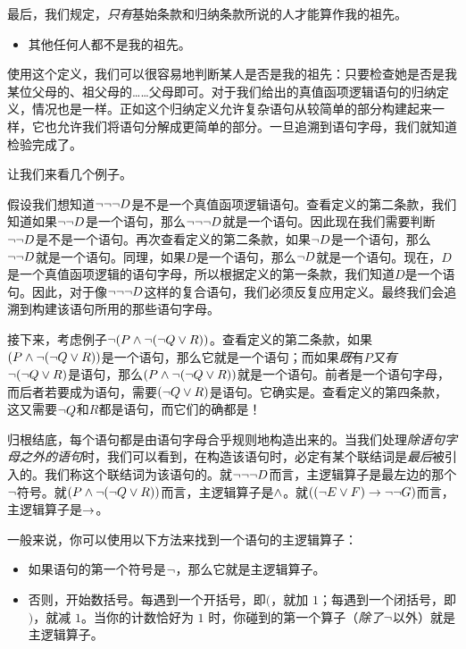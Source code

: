 最后，我们规定，\emph{只有}基始条款和归纳条款所说的人才能算作我的祖先。


\begin{itemize}
		\item 其他任何人都不是我的祖先。
	\end{itemize}


使用这个定义，我们可以很容易地判断某人是否是我的祖先：只要检查她是否是我某位父母的、祖父母的……父母即可。对于我们给出的真值函项逻辑语句的归纳定义，情况也是一样。正如这个归纳定义允许复杂语句从较简单的部分构建起来一样，它也允许我们将语句分解成更简单的部分。一旦追溯到语句字母，我们就知道检验完成了。

让我们来看几个例子。

假设我们想知道$\neg \neg \neg D$是不是一个真值函项逻辑语句。查看定义的第二条款，我们知道如果$\neg \neg D$是一个语句，那么$\neg \neg \neg D$就是一个语句。因此现在我们需要判断$\neg \neg D$是不是一个语句。再次查看定义的第二条款，如果$\neg D$是一个语句，那么$\neg \neg D$就是一个语句。同理，如果$D$是一个语句，那么$\neg D$就是一个语句。现在，$D$是一个真值函项逻辑的语句字母，所以根据定义的第一条款，我们知道$D$是一个语句。因此，对于像$\neg \neg \neg D$这样的复合语句，我们必须反复应用定义。最终我们会追溯到构建该语句所用的那些语句字母。

接下来，考虑例子$\neg (P \wedge \neg (\neg Q \vee R))$。查看定义的第二条款，如果$(P \wedge \neg (\neg Q \vee R))$是一个语句，那么它就是一个语句；而如果\emph{既}有$P$\emph{又有}$\neg (\neg Q \vee R)$是语句，那么$(P \wedge \neg (\neg Q \vee R))$就是一个语句。前者是一个语句字母，而后者若要成为语句，需要$(\neg Q \vee R)$是语句。它确实是。查看定义的第四条款，这又需要$\neg Q$和$R$都是语句，而它们的确都是！

归根结底，每个语句都是由语句字母合乎规则地构造出来的。当我们处理\emph{除语句字母之外的语句}时，我们可以看到，在构造该语句时，必定有某个联结词是\emph{最后}被引入的。我们称这个联结词为该语句的。就$\neg\neg\neg D$而言，主逻辑算子是最左边的那个$\neg$符号。就$(P \wedge \neg (\neg Q \vee R))$而言，主逻辑算子是$\wedge$。就$((\neg E \vee F) \rightarrow \neg\neg G)$而言，主逻辑算子是$\rightarrow$。

一般来说，你可以使用以下方法来找到一个语句的主逻辑算子：


\begin{itemize}
	\item 如果语句的第一个符号是$\neg$，那么它就是主逻辑算子。
	\item 否则，开始数括号。每遇到一个开括号，即$($，就加 $1$；每遇到一个闭括号，即$)$，就减 $1$。当你的计数恰好为 $1$ 时，你碰到的第一个算子（\emph{除了}$\neg$以外）就是主逻辑算子。
\end{itemize}

